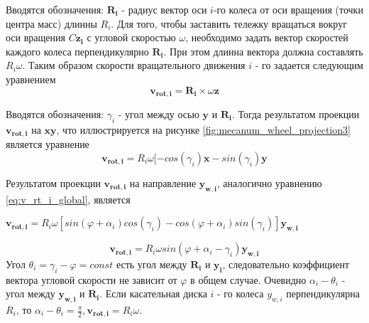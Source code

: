 \documentclass[oneside,final,14pt]{extreport}
\newcommand{\bs}{\boldsymbol}
\begin{document}
\begin{figure}[H]
\end{figure} 

 Вводятся обозначения: $\bs{R_{i}}$ - радиус вектор оси $i$-го колеса от оси вращения  (точки центра масс) длинны $R_{i}$. Для того, чтобы заставить тележку вращаться вокруг оси вращения $C\bs{z_{l}}$ с угловой скоростью $\omega$, необходимо задать вектор скоростей каждого колеса перпендикулярно $\bs{R_{i}}$. При этом длинна вектора должна составлять $R_{i}\omega$.
Таким образом скорости вращательного движения $i$ - го задается следующим уравнением
\begin{equation}
\bs{v_{rot,i}}
=
\bs{R_{i}}
\times
\omega
\bs{z}
\end{equation}

\begin{figure}[H]
\end{figure}

 Вводятся обозначения: $\gamma_{i}$ - угол между осью $\bs{y}$ и  $\bs{R_{i}}$. Тогда результатом проекции $\bs{v_{rot,i}}$   на  $\bs{xy}$, что иллюстрируется на рисунке \ref{fig:mecanum_wheel_projection3} является уравнение 
\begin{equation}
\bs{v_{rot,i}}
=
R_{i}
\omega
[
-cos(\gamma_{i})
\bs{x}
-
sin(\gamma_{i})
\bs{y}
\end{equation}

Результатом проекции $\bs{v_{rot,i}}$ на направление $\bs{y_{w,i}}$, аналогично уравнению \ref{eq:v_rt_i_global}, является
\begin{center}
$
\bs{v_{rot,i}}
=
R_{i}
\omega
[
sin(\varphi + \alpha_{i})
cos(\gamma_{i})
-
cos(\varphi+\alpha_{i})
sin(\gamma_{i})
]
\bs{y_{w,i}}
$
\end{center}
\begin{equation}
\bs{v_{rot,i}}
=
R_{i}
\omega
sin(\varphi+\alpha_{i}-\gamma_{i})
\bs{y_{w,i}}
\end{equation}
Угол $\theta_{i} = \gamma_{i} -\varphi = const$ есть угол между $\bs{R_{i}}$ и $\bs{y_{l}}$, следовательно коэффициент вектора угловой скорости не зависит от $\varphi$ в общем случае. Очевидно $\alpha_{i} - \theta_{i}$ - угол между $\bs{y_{w,i}}$ и $\bs{R_{i}}$. Если касательная диска $i$ - го колеса $y_{w,i}$  перпендикулярна $R_{i}$, то $\alpha_{i} - \theta_{i} = \frac{\pi}{2}, \bs{v_{rot,i}} = R_{i}\omega$. 
\iffalse
 Кроме того, справедливо 
\begin{gather}
\dot{x}
=
v_{x}\bs{x}
\\
\dot{y}
=
v_{y}\bs{y}
\\
\dot{\varphi}
=
\omega\bs{z}
\end{gather}
Где  $v_{x}$, $v_{x}$, $\omega$ - величина скорости по направлению $\bs{x}$ и $\bs{y}$ соответственно, $\omega$ - величина угловой скорости.
\fi 
\end{document}
